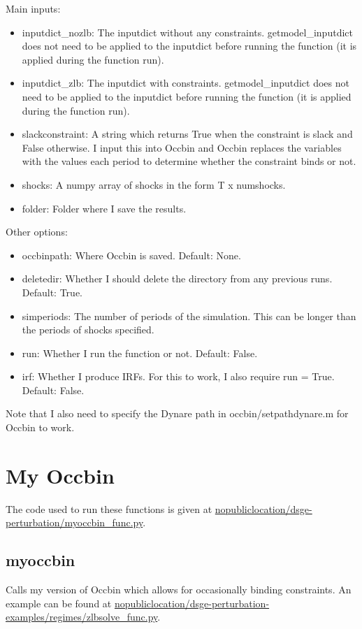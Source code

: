 \documentclass{article}
\theoremstyle{definition}
\begin{document}
Main inputs:
\begin{itemize}
    \item inputdict\_nozlb: The inputdict without any constraints. getmodel\_inputdict does not need to be applied to the inputdict before running the function (it is applied during the function run).
    \item inputdict\_zlb: The inputdict with constraints. getmodel\_inputdict does not need to be applied to the inputdict before running the function (it is applied during the function run).
    \item slackconstraint: A string which returns True when the constraint is slack and False otherwise. I input this into Occbin and Occbin replaces the variables with the values each period to determine whether the constraint binds or not.
    \item shocks: A numpy array of shocks in the form T x numshocks.
    \item folder: Folder where I save the results.
\end{itemize}

Other options:
\begin{itemize}
    \item occbinpath: Where Occbin is saved. Default: None.
    \item deletedir: Whether I should delete the directory from any previous runs. Default: True.
    \item simperiods: The number of periods of the simulation. This can be longer than the periods of shocks specified.
    \item run: Whether I run the function or not. Default: False.
    \item irf: Whether I produce IRFs. For this to work, I also require run = True. Default: False.
\end{itemize}

Note that I also need to specify the Dynare path in occbin/setpathdynare.m for Occbin to work.


\section{My Occbin}
The code used to run these functions is given at \url{nopubliclocation/dsge-perturbation/myoccbin_func.py}.

\subsection{myoccbin}
Calls my version of Occbin which allows for occasionally binding constraints. An example can be found at \url{nopubliclocation/dsge-perturbation-examples/regimes/zlbsolve_func.py}.
\end{document}
